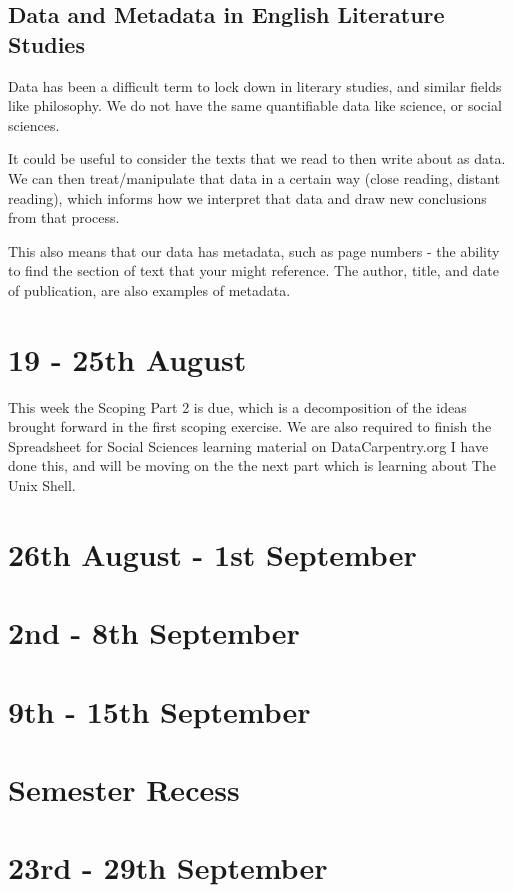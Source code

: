 \documentclass{article}
\begin{document}
\subsection{Data and Metadata in English Literature Studies}

Data has been a difficult term to lock down in literary studies, and similar fields like philosophy. We do not have the same quantifiable data like science, or social sciences. 

It could be useful to consider the texts that we read to then write about as data. We can then treat/manipulate that data in a certain way (close reading, distant reading), which informs how we interpret that data and draw new conclusions from that process. 

This also means that our data has metadata, such as page numbers - the ability to find the section of text that your might reference. The author, title, and date of publication, are also examples of metadata.

\section{19 - 25th August}

This week the Scoping Part 2 is due, which is a decomposition of the ideas brought forward in the first scoping exercise. 
We are also required to finish the Spreadsheet for Social Sciences learning material on DataCarpentry.org
I have done this, and will be moving on the the next part which is learning about The Unix Shell.

\section{26th August - 1st September}

\section{2nd - 8th September}

\section{9th - 15th September}

\section*{Semester Recess}

\section{23rd - 29th September}
\end{document}
